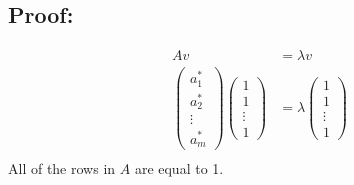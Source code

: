 \documentclass[fleqn]{article}
\begin{document}
\subsection*{Proof: }
\begin{equation*}
    \begin{split}
        Av&=\lambda v\\
        \begin{pmatrix}a^*_1\\a^*_2\\ \vdots \\a^*_m\end{pmatrix}\begin{pmatrix}1\\1\\ \vdots\\1\end{pmatrix}&=\lambda \begin{pmatrix}1\\1\\ \vdots\\1\end{pmatrix}\\
    \end{split}
\end{equation*}
All of the rows in $A$ are equal to 1.
\end{document}
